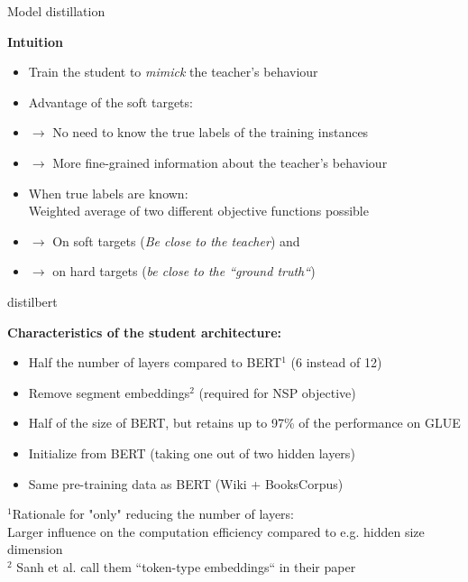 \documentclass[11pt,compress,t,notes=noshow, xcolor=table]{beamer}
\begin{document}

\begin{frame}{Model distillation}

\vfill

\textbf{Intuition}

\begin{itemize}
	\item Train the student to \textit{mimick} the teacher's behaviour
	\item \ques Advantage of the soft targets:
	\item[] $\to$ No need to know the true labels of the training instances
	\item[] $\to$ More fine-grained information about the teacher's behaviour 
	\item When true labels are known:\\
				Weighted average of two different objective functions possible\\
	\item[] $\to$ On soft targets (\textit{Be close to the teacher}) and 
	\item[] $\to$ on hard targets (\textit{be close to the ``ground truth``})
\end{itemize}

\vfill

\end{frame}


\begin{frame}{distilbert}

\vfill

\textbf{Characteristics of the student architecture:}

\begin{itemize}
	\item Half the number of layers compared to BERT$^1$ (6 instead of 12)
	\item Remove segment embeddings$^2$ (required for NSP objective)
 	\item Half of the size of BERT, but retains up to 97\% of the performance on GLUE
	\item Initialize from BERT (taking one out of two hidden layers)
	\item Same pre-training data as BERT (Wiki + BooksCorpus)
\end{itemize}

\vfill

{\footnotesize $^1$Rationale for "only" reducing the number of layers:\\
Larger influence on the computation efficiency compared to e.g. hidden size dimension\\
$^2$ Sanh et al. call them ``token-type embeddings`` in their paper}

\end{frame}
\end{document}
